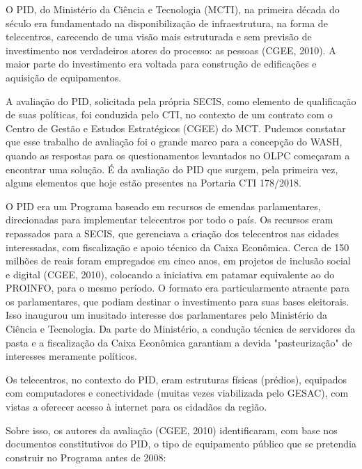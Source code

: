 O PID, do Ministério da Ciência e Tecnologia (MCTI), na primeira década do século era fundamentado na disponibilização de infraestrutura, na forma de telecentros, carecendo de uma visão mais estruturada e sem previsão de investimento nos verdadeiros atores do processo: as pessoas (CGEE, 2010). A maior parte do investimento era voltada para construção de edificações e aquisição de equipamentos.

A avaliação do PID, solicitada pela própria SECIS, como elemento de qualificação de suas políticas, foi conduzida pelo CTI, no contexto de um contrato com o Centro de Gestão e Estudos Estratégicos (CGEE) do MCT. Pudemos constatar que esse trabalho de avaliação foi o grande marco para a concepção do WASH, quando as respostas para os questionamentos levantados no OLPC começaram a encontrar uma solução. É da avaliação do PID que surgem, pela primeira vez, alguns elementos que hoje estão presentes na Portaria CTI 178/2018.

O PID era um Programa baseado em recursos de emendas parlamentares, direcionadas para implementar telecentros por todo o país. Os recursos eram repassados para a SECIS, que gerenciava a criação dos telecentros nas cidades interessadas, com fiscalização e apoio técnico da Caixa Econômica. Cerca de 150 milhões de reais foram empregados em cinco anos, em projetos de inclusão social e digital (CGEE, 2010), colocando a iniciativa em patamar equivalente ao do PROINFO, para o mesmo período. O formato era particularmente atraente para os parlamentares, que podiam destinar o investimento para suas bases eleitorais. Isso inaugurou um inusitado interesse dos parlamentares pelo Ministério da Ciência e Tecnologia. Da parte do Ministério, a condução técnica de servidores da pasta e a fiscalização da Caixa Econômica garantiam a devida "pasteurização" de interesses meramente políticos.

Os telecentros, no contexto do PID, eram estruturas físicas (prédios), equipados com computadores e conectividade (muitas vezes viabilizada pelo GESAC), com vistas a oferecer acesso à internet para os cidadãos da região.

Sobre isso, os autores da avaliação (CGEE, 2010) identificaram, com base nos documentos constitutivos do PID, o tipo de equipamento público que se pretendia construir no Programa antes de 2008:


\noindent\begin{flushright}\mbox{\linespread{1}\selectfont\centering{}}\end{flushright}


